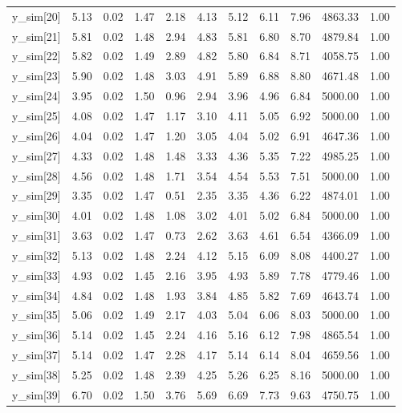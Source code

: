 \begin{table}[ht]
\begin{tabular}{rrrrrrrrrrr}
  y\_sim[20] & 5.13 & 0.02 & 1.47 & 2.18 & 4.13 & 5.12 & 6.11 & 7.96 & 4863.33 & 1.00 \\ 
  y\_sim[21] & 5.81 & 0.02 & 1.48 & 2.94 & 4.83 & 5.81 & 6.80 & 8.70 & 4879.84 & 1.00 \\ 
  y\_sim[22] & 5.82 & 0.02 & 1.49 & 2.89 & 4.82 & 5.80 & 6.84 & 8.71 & 4058.75 & 1.00 \\ 
  y\_sim[23] & 5.90 & 0.02 & 1.48 & 3.03 & 4.91 & 5.89 & 6.88 & 8.80 & 4671.48 & 1.00 \\ 
  y\_sim[24] & 3.95 & 0.02 & 1.50 & 0.96 & 2.94 & 3.96 & 4.96 & 6.84 & 5000.00 & 1.00 \\ 
  y\_sim[25] & 4.08 & 0.02 & 1.47 & 1.17 & 3.10 & 4.11 & 5.05 & 6.92 & 5000.00 & 1.00 \\ 
  y\_sim[26] & 4.04 & 0.02 & 1.47 & 1.20 & 3.05 & 4.04 & 5.02 & 6.91 & 4647.36 & 1.00 \\ 
  y\_sim[27] & 4.33 & 0.02 & 1.48 & 1.48 & 3.33 & 4.36 & 5.35 & 7.22 & 4985.25 & 1.00 \\ 
  y\_sim[28] & 4.56 & 0.02 & 1.48 & 1.71 & 3.54 & 4.54 & 5.53 & 7.51 & 5000.00 & 1.00 \\ 
  y\_sim[29] & 3.35 & 0.02 & 1.47 & 0.51 & 2.35 & 3.35 & 4.36 & 6.22 & 4874.01 & 1.00 \\ 
  y\_sim[30] & 4.01 & 0.02 & 1.48 & 1.08 & 3.02 & 4.01 & 5.02 & 6.84 & 5000.00 & 1.00 \\ 
  y\_sim[31] & 3.63 & 0.02 & 1.47 & 0.73 & 2.62 & 3.63 & 4.61 & 6.54 & 4366.09 & 1.00 \\ 
  y\_sim[32] & 5.13 & 0.02 & 1.48 & 2.24 & 4.12 & 5.15 & 6.09 & 8.08 & 4400.27 & 1.00 \\ 
  y\_sim[33] & 4.93 & 0.02 & 1.45 & 2.16 & 3.95 & 4.93 & 5.89 & 7.78 & 4779.46 & 1.00 \\ 
  y\_sim[34] & 4.84 & 0.02 & 1.48 & 1.93 & 3.84 & 4.85 & 5.82 & 7.69 & 4643.74 & 1.00 \\ 
  y\_sim[35] & 5.06 & 0.02 & 1.49 & 2.17 & 4.03 & 5.04 & 6.06 & 8.03 & 5000.00 & 1.00 \\ 
  y\_sim[36] & 5.14 & 0.02 & 1.45 & 2.24 & 4.16 & 5.16 & 6.12 & 7.98 & 4865.54 & 1.00 \\ 
  y\_sim[37] & 5.14 & 0.02 & 1.47 & 2.28 & 4.17 & 5.14 & 6.14 & 8.04 & 4659.56 & 1.00 \\ 
  y\_sim[38] & 5.25 & 0.02 & 1.48 & 2.39 & 4.25 & 5.26 & 6.25 & 8.16 & 5000.00 & 1.00 \\ 
  y\_sim[39] & 6.70 & 0.02 & 1.50 & 3.76 & 5.69 & 6.69 & 7.73 & 9.63 & 4750.75 & 1.00 \\ 

\end{tabular}
\end{table}
